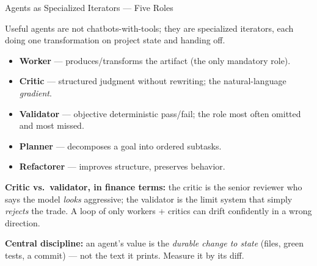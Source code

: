 \documentclass[9pt,t]{beamer}
\begin{document}
\begin{frame}{Agents as Specialized Iterators --- Five Roles}

Useful agents are not chatbots-with-tools; they are \alert{specialized
iterators}, each doing one transformation on project state and handing off.

\medskip
\begin{itemize}
  \item \textbf{Worker} --- produces/transforms the artifact (the only mandatory role).
  \item \textbf{Critic} --- structured judgment without rewriting; the
        natural-language \emph{gradient}.
  \item \textbf{Validator} --- objective deterministic pass/fail; the role most
        often omitted and most missed.
  \item \textbf{Planner} --- decomposes a goal into ordered subtasks.
  \item \textbf{Refactorer} --- improves structure, preserves behavior.
\end{itemize}

\medskip
\begin{bigpicture}
\textbf{Critic vs.\ validator, in finance terms:} the critic is the senior
reviewer who says the model \emph{looks} aggressive; the validator is the limit
system that simply \emph{rejects} the trade. A loop of only workers + critics can
drift confidently in a wrong direction.
\end{bigpicture}

\medskip
\textbf{Central discipline:} an agent's value is the \emph{durable change to
state} (files, green tests, a commit) --- not the text it prints. Measure it by
its diff.
\end{frame}
\end{document}
